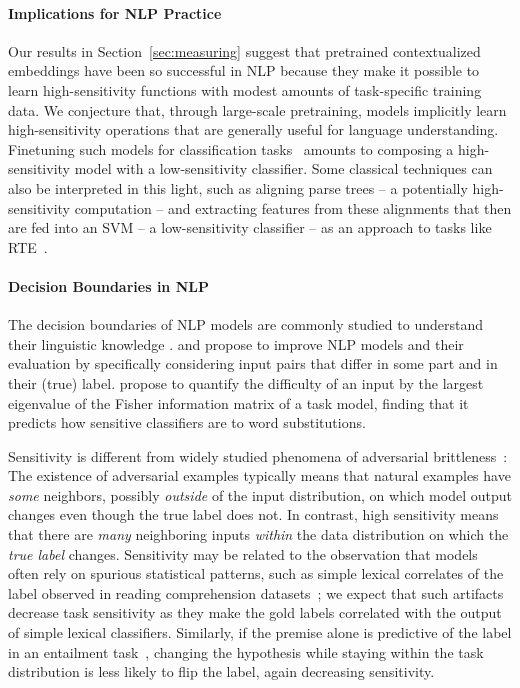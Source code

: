 \documentclass[11pt,a4paper]{article}
\begin{document}
\paragraph{Implications for NLP Practice}

Our results in Section~\ref{sec:measuring} suggest that pretrained contextualized embeddings have been so successful in NLP because they make it possible to learn high-sensitivity functions with modest amounts of task-specific training data.
We conjecture that, through large-scale pretraining, models implicitly learn high-sensitivity operations that are generally useful for language understanding. Finetuning such models for classification tasks~\citep{howard2018universal, peters2018deep, devlin2019bert} amounts to composing a high-sensitivity model with a low-sensitivity classifier.
Some classical techniques can also be interpreted in this light, such as aligning parse trees -- a potentially high-sensitivity computation -- and extracting features from these alignments that then are fed into an SVM -- a low-sensitivity classifier -- as an approach to tasks like RTE~\citep{dagan2009recognizing}.


\paragraph{Decision Boundaries in NLP}
The decision boundaries of NLP models are commonly studied to understand their linguistic knowledge \citep[e.g.][]{linzen2016assessing, marvin2018targeted, futrell2019neural, jeretic2020are}.
\citet{kaushik2020learning} and \citet{gardner2020evaluating} propose to improve NLP models and their evaluation by specifically considering input pairs that differ in some part and in their (true) label.
\citet{datta2020geometry} propose to quantify the difficulty of an input by the largest eigenvalue of the Fisher information matrix of a task model, finding that it predicts how sensitive classifiers are to word substitutions.


Sensitivity is different from widely studied phenomena of adversarial brittleness~\citep{szegedy2013intriguing, jia2017adversarial}:
The existence of adversarial examples typically means that natural examples have \emph{some} neighbors, possibly \emph{outside} of the input distribution, on which model output changes even though the true label does not.
In contrast, high sensitivity means that there are \emph{many} neighboring inputs \emph{within} the data distribution on which the \emph{true label} changes.
Sensitivity may be related to the observation that models often rely on spurious statistical patterns, such as simple lexical correlates of the label observed in reading comprehension datasets~\citep[e.g.][]{kaushik2018how,gururangan2018annotation}; we expect that such artifacts decrease task sensitivity as they make the gold labels correlated with the output of simple lexical classifiers.
Similarly, if the premise alone is predictive of the label in an entailment task~\citep{poliak2018hypothesis}, changing the hypothesis while staying within the task distribution is less likely to flip the label, again decreasing sensitivity.
\end{document}
